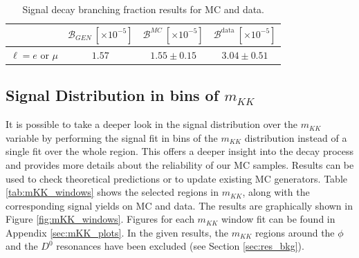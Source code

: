 \begin{table}[H]
	\centering
	\begin{tabular}{l|c|c|c}
		& $\mathcal{B}_{GEN}~[\times 10^{-5}]$ & $\mathcal{B}^{MC}~[\times 10^{-5}]$ & $\mathcal{B}^{\mathrm{data}}~[\times 10^{-5}]$ \\
		\toprule
		$\ell = e$ or $\mu$ & $1.57$ & $1.55 \pm 0.15$ & $3.04 \pm 0.51$\\
		\bottomrule
	\end{tabular}
	\captionsetup{width=.8\linewidth}
	\caption{Signal decay branching fraction results for MC and data.}
	\label{tab:br_result_sig}
\end{table}

\subsection{Signal Distribution in bins of \texorpdfstring{$m_{KK}$}{mKK}}

It is possible to take a deeper look in the signal distribution over the $m_{KK}$ variable by performing the signal fit in bins of the $m_{KK}$ distribution instead of a single fit over the whole region. This offers a deeper insight into the decay process and provides more details about the reliability of our MC samples. Results can be used to check theoretical predictions or to update existing MC generators. Table \ref{tab:mKK_windows} shows the selected regions in $m_{KK}$, along with the corresponding signal yields on MC and data. The results are graphically shown in Figure \ref{fig:mKK_windows}. Figures for each $m_{KK}$ window fit can be found in Appendix \ref{sec:mKK_plots}. In the given results, the $m_{KK}$ regions around the $\phi$ and the $D^0$ resonances have been excluded (see Section \ref{sec:res_bkg}).

